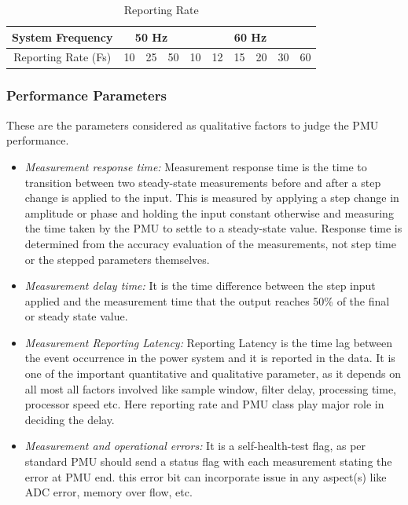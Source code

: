 \begin{table}[h]
	\begin{center}
		\setlength\arrayrulewidth{1pt}
		\begin{tabular}{|c|c|c|c|c|c|c|c|c|c|}
			\hline
			System Frequency & \multicolumn{3}{c}{50 Hz} & \multicolumn{6}{|c|}{60 Hz}\\
			\hline 
			Reporting Rate (Fs)& 10 & 25 & 50 & 	10& 12 &15 & 20 & 30 & 60\\
			\hline
		\end{tabular}
	\end{center}
		\caption{Reporting Rate}
\end{table}
 

\subsubsection{Performance Parameters}
These are the parameters considered as qualitative factors to judge the PMU performance. 

\begin{itemize}
	\item  \emph{Measurement response time:} Measurement response time is the time to transition between two steady-state measurements before and
	after a step change is applied to the input. This is measured by applying a step change in amplitude or phase and holding the input constant otherwise and measuring the time taken  by the PMU to settle to a steady-state value. Response time is determined from the accuracy evaluation of the measurements, not step time or the stepped	parameters themselves.
	\item \emph{Measurement delay time:} It is the time difference between the step input applied and the measurement time that the output reaches 50\% of the final or steady state value.  
	\item \emph{Measurement Reporting Latency:} Reporting Latency is the time lag between the event occurrence in the power system and it is reported in the data. It is one of the important quantitative and qualitative parameter, as it depends on all most all factors involved like sample window, filter delay, processing time, processor speed etc. Here reporting rate and PMU class play major role in deciding the delay. 
	\item \emph{Measurement and operational errors:} It is a self-health-test flag, as per standard PMU should send a status flag with each measurement stating the error at PMU end. this error bit can incorporate issue in any aspect(s) like ADC error, memory over flow, etc.
\end{itemize}

